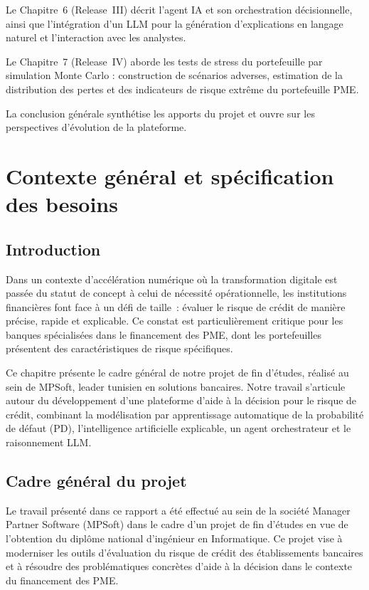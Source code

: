 \documentclass[a4paper,12pt,oneside]{report}
\begin{document}
Le Chapitre~6 (Release~III) décrit l'agent IA et son orchestration décisionnelle,
ainsi que l'intégration d'un LLM pour la génération d'explications en langage naturel et
l'interaction avec les analystes.

Le Chapitre~7 (Release~IV) aborde les tests de stress du portefeuille par
simulation Monte Carlo : construction de scénarios adverses, estimation de la distribution
des pertes et des indicateurs de risque extrême du portefeuille PME.

La conclusion générale synthétise les apports du projet et ouvre sur les
perspectives d'évolution de la plateforme.

\chapter{Contexte général et spécification des besoins}

\section*{Introduction}

Dans un contexte d'accélération numérique où la transformation digitale est passée du
statut de concept à celui de nécessité opérationnelle, les institutions financières font
face à un défi de taille~: évaluer le risque de crédit de manière précise, rapide et
explicable. Ce constat est particulièrement critique pour les banques spécialisées dans le
financement des PME, dont les portefeuilles présentent des caractéristiques de risque
spécifiques.

Ce chapitre présente le cadre général de notre projet de fin d'études, réalisé au sein de
MPSoft, leader tunisien en solutions bancaires. Notre travail
s'articule autour du développement d'une plateforme d'aide à la décision pour le risque de
crédit, combinant la modélisation par apprentissage automatique de la probabilité de défaut
(PD), l'intelligence artificielle explicable, un agent orchestrateur et le raisonnement LLM.

\section{Cadre général du projet}

Le travail présenté dans ce rapport a été effectué au sein de la société Manager Partner
Software (MPSoft) dans le cadre d'un projet de fin d'études en vue de l'obtention du
diplôme national d'ingénieur en Informatique. Ce projet vise à moderniser les outils
d'évaluation du risque de crédit des établissements bancaires et à résoudre des
problématiques concrètes d'aide à la décision dans le contexte du financement des PME.
\end{document}
